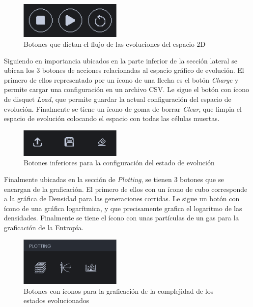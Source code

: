 \documentclass[]{article}
\begin{document}
				\begin{figure}[!h]
					\centering
					\includegraphics[width=5cm]{Imagenes/botones_correr.png}
					\caption{Botones que dictan el flujo de las evoluciones del espacio 2D}
					\label{Evolution_buttons}
				\end{figure}
				
				\hfill \break
				Siguiendo en importancia ubicados en la parte inferior de la sección lateral se ubican los 3 botones de acciones relacionadas al espacio gráfico de evolución. El primero de ellos representado por un ícono de una flecha es el botón \textit{Charge} y permite cargar una configuración en un archivo CSV. Le sigue el botón con ícono de disquet \textit{Load}, que permite guardar la actual configuración del espacio de evolución. Finalmente se tiene un ícono de goma de borrar \textit{Clear}, que limpia el espacio de evolución colocando el espacio con todas las células muertas.
				
				\begin{figure}[!h]
					\centering
					\includegraphics[width=5cm]{Imagenes/botones_inferiores.png}
					\caption{Botones inferiores para la configuración del estado de evolución}
					\label{Space_configuration_buttons}
				\end{figure}
				
				\hfill \break
				Finalmente ubicadas en la sección de \textit{Plotting}, se tienen 3 botones que se encargan de la graficación.
				El primero de ellos con un ícono de cubo corresponde a la gráfica de Densidad para las generaciones corridas. Le sigue un botón con ícono de una gráfica logarítmica, y que precisamente grafica el logaritmo de las densidades. Finalmente se tiene el ícono con unas partículas de un gas para la graficación de la Entropía.
				
				\begin{figure}[!h]
					\centering
					\includegraphics[width=5cm]{Imagenes/botones_plots.png}
					\caption{Botones con íconos para la graficación de la complejidad de los estados evolucionados}
					\label{Botones_graficacion}
				\end{figure}
			
\end{document}
